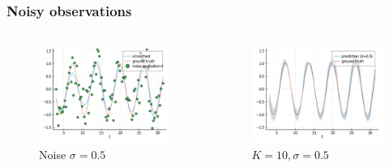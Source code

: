 \documentclass[11pt,aspectratio=169]{beamer}
\begin{document}
\begin{frame}
    \frametitle{Noisy observations}
    \begin{columns}
        \begin{column}{0.5\textwidth}
            \begin{figure}[h!]
                 \centering
                 \includegraphics[width=\columnwidth]{figures/10d05sigma_smoothed.png}
                 \caption{Noise $\sigma=0.5$}
             \end{figure}
        \end{column}
        \begin{column}{0.5\textwidth}
            \begin{figure}[h!]
                \centering
                \includegraphics[width=\columnwidth]{figures/10d05sigma_conf.png}
                \caption{$K=10, \sigma=0.5$}
            \end{figure}
        \end{column}
    \end{columns}
\end{frame}
\end{document}
